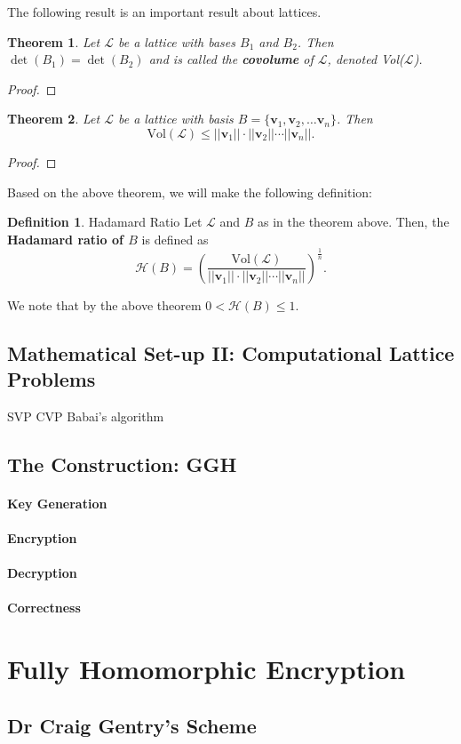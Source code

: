 \documentclass{article}
\newtheorem{theorem}{Theorem}[section]
\theoremstyle{definition}
\newtheorem{definition}{Definition}[section]
\renewcommand{\L}{\mathcal{L}}
\renewcommand{\H}{\mathcal{H}}
\renewcommand{\vec}[1]{\textbf{#1}}
\newcommand{\norm}[1]{||#1||}
\begin{document}
The following result is an important result about lattices.
\begin{theorem}
  Let $\L$ be a lattice with bases $B_1$ and $B_2$. Then $\det(B_1) = \det(B_2)$
  and is called the \textbf{covolume} of $\L$, denoted Vol($\L$).
\end{theorem}
\begin{proof}
\end{proof}
\begin{theorem}
  Let $\L$ be a lattice with basis $B = \{\vec{v}_1, \vec{v}_2, \hdots \vec{v}_n\}$. Then
\[
  \text{Vol}(\L) \leq \norm{\vec{v}_1}\cdot\norm{\vec{v}_2}\cdots\norm{\vec{v}_n}.
\]
\end{theorem}
\begin{proof}
\end{proof}
Based on the above theorem, we will make the following definition:
\begin{definition}{Hadamard Ratio}
  Let $\L$ and $B$ as in the theorem above. Then, the \textbf{Hadamard ratio of $B$}
  is defined as
  \[
    \H(B) = \left( \frac{\text{Vol}(\L)}{\norm{\vec{v}_1}\cdot\norm{\vec{v}_2}\cdots\norm{\vec{v}_n}} \right)^{\frac1n}.
  \]
\end{definition}
We note that by the above theorem $0 < \H(B) \leq 1$.
\subsection{Mathematical Set-up II: Computational Lattice Problems}
SVP
CVP
Babai's algorithm
\subsection{The Construction: GGH}
\paragraph{Key Generation}
\paragraph{Encryption}
\paragraph{Decryption}
\paragraph{Correctness}
\section{Fully Homomorphic Encryption}
\subsection{Dr Craig Gentry's Scheme}

\printbibliography
\end{document}
